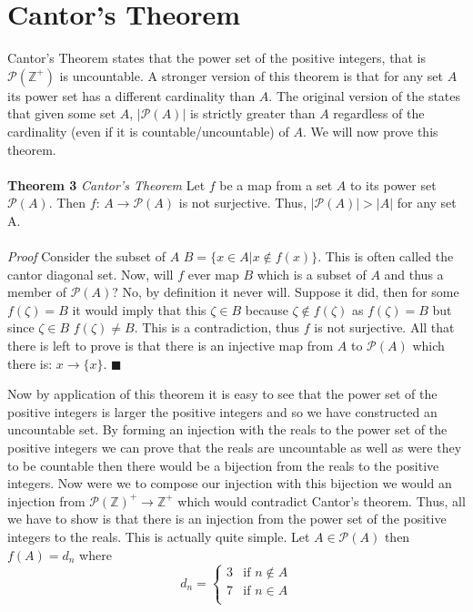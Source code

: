 \documentclass{article}
\begin{document}
\section{Cantor's Theorem}
\par Cantor's Theorem states that the power set of the positive integers, that is $\mathcal{P}(\mathbb{Z}^{+})$ is uncountable. A stronger version of this theorem is that for any set $A$ its power set has a different cardinality than $A$. The original version of the states that given some set $A$, $|\mathcal{P}(A)|$ is strictly greater than $A$ regardless of the cardinality (even if it is countable/uncountable) of $A$. We will now prove this theorem.
\\
\\
\textbf{Theorem 3} \textit{Cantor's Theorem} Let $f$ be a map from a set $A$ to its power set $\mathcal{P}(A)$. Then $f$: $A \to \mathcal{P}(A)$ is not surjective. Thus, $|\mathcal{P}(A)| > |A|$ for any set A. 
\\
\\
\textit{Proof} Consider the subset of $A$ $B=\{x \in A | x \not \in f(x)\}$. This is often called the cantor diagonal set. Now, will $f$ ever map $B$ which is a subset of $A$ and thus a member of $\mathcal{P}(A)$? No, by definition it never will. Suppose it did, then for some $f(\zeta)=B$ it would imply that this $\zeta \in B$ because $\zeta \not \in f(\zeta)$ as $f(\zeta)=B$ but since $\zeta \in B$ $f(\zeta) \not = B$. This is a contradiction, thus $f$ is not surjective. All that there is left to prove is that there is an injective map from $A$ to $\mathcal{P}(A)$ which there is: $x \to \{x\}$. $\blacksquare$
\\
\par Now by application of this theorem it is easy to see that the power set of the positive integers is larger the positive integers and so we have constructed an uncountable set. By forming an injection with the reals to the power set of the positive integers we can prove that the reals are uncountable as well as were they to be countable then there would be a bijection from the reals to the positive integers. Now were we to compose our injection with this bijection we would an injection from $\mathcal{P}(\mathbb{Z})^{+} \to \mathbb{Z}^{+}$ which would contradict Cantor's theorem. Thus, all we have to show is that there is an injection from the power set of the positive integers to the reals. This is actually quite simple. Let $A \in \mathcal{P}(A)$ then $f(A)=d_{n}$ where
\[
d_{n}= \begin{cases}
3 & \text{if } n \not \in A \\
7 & \text{if } n \in A \\
\end{cases}
\]
 
\end{document}
